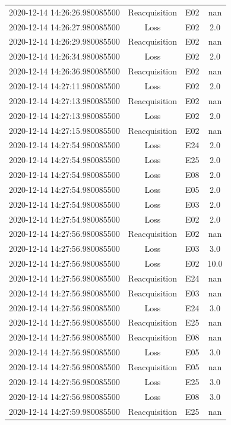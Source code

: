 \begin{enumerate}
\begin{longtabu}{cccc}
2020{-}12{-}14 14:26:26.980085500&Reacquisition&E02&nan\\%
2020{-}12{-}14 14:26:27.980085500&Loss&E02&2.0\\%
2020{-}12{-}14 14:26:29.980085500&Reacquisition&E02&nan\\%
2020{-}12{-}14 14:26:34.980085500&Loss&E02&2.0\\%
2020{-}12{-}14 14:26:36.980085500&Reacquisition&E02&nan\\%
2020{-}12{-}14 14:27:11.980085500&Loss&E02&2.0\\%
2020{-}12{-}14 14:27:13.980085500&Reacquisition&E02&nan\\%
2020{-}12{-}14 14:27:13.980085500&Loss&E02&2.0\\%
2020{-}12{-}14 14:27:15.980085500&Reacquisition&E02&nan\\%
2020{-}12{-}14 14:27:54.980085500&Loss&E24&2.0\\%
2020{-}12{-}14 14:27:54.980085500&Loss&E25&2.0\\%
2020{-}12{-}14 14:27:54.980085500&Loss&E08&2.0\\%
2020{-}12{-}14 14:27:54.980085500&Loss&E05&2.0\\%
2020{-}12{-}14 14:27:54.980085500&Loss&E03&2.0\\%
2020{-}12{-}14 14:27:54.980085500&Loss&E02&2.0\\%
2020{-}12{-}14 14:27:56.980085500&Reacquisition&E02&nan\\%
2020{-}12{-}14 14:27:56.980085500&Loss&E03&3.0\\%
2020{-}12{-}14 14:27:56.980085500&Loss&E02&10.0\\%
2020{-}12{-}14 14:27:56.980085500&Reacquisition&E24&nan\\%
2020{-}12{-}14 14:27:56.980085500&Reacquisition&E03&nan\\%
2020{-}12{-}14 14:27:56.980085500&Loss&E24&3.0\\%
2020{-}12{-}14 14:27:56.980085500&Reacquisition&E25&nan\\%
2020{-}12{-}14 14:27:56.980085500&Reacquisition&E08&nan\\%
2020{-}12{-}14 14:27:56.980085500&Loss&E05&3.0\\%
2020{-}12{-}14 14:27:56.980085500&Reacquisition&E05&nan\\%
2020{-}12{-}14 14:27:56.980085500&Loss&E25&3.0\\%
2020{-}12{-}14 14:27:56.980085500&Loss&E08&3.0\\%
2020{-}12{-}14 14:27:59.980085500&Reacquisition&E25&nan\\%

\end{longtabu}
\end{enumerate}
